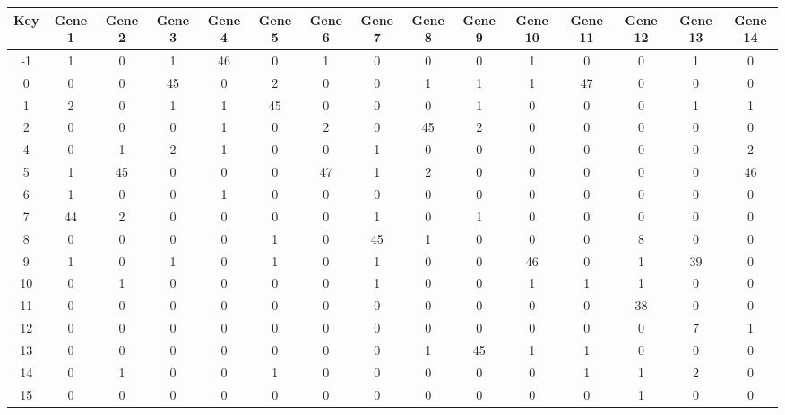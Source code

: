 \begin{tabular}{|c|c|c|c|c|c|c|c|c|c|c|c|c|c|c|}
\hline
Key & Gene 1 & Gene 2 & Gene 3 & Gene 4 & Gene 5 & Gene 6 & Gene 7 & Gene 8 & Gene 9 & Gene 10 & Gene 11 & Gene 12 & Gene 13 & Gene 14 \\
\hline
-1 & 1 & 0 & 1 & 46 & 0 & 1 & 0 & 0 & 0 & 1 & 0 & 0 & 1 & 0 \\
0 & 0 & 0 & 45 & 0 & 2 & 0 & 0 & 1 & 1 & 1 & 47 & 0 & 0 & 0 \\
1 & 2 & 0 & 1 & 1 & 45 & 0 & 0 & 0 & 1 & 0 & 0 & 0 & 1 & 1 \\
2 & 0 & 0 & 0 & 1 & 0 & 2 & 0 & 45 & 2 & 0 & 0 & 0 & 0 & 0 \\
4 & 0 & 1 & 2 & 1 & 0 & 0 & 1 & 0 & 0 & 0 & 0 & 0 & 0 & 2 \\
5 & 1 & 45 & 0 & 0 & 0 & 47 & 1 & 2 & 0 & 0 & 0 & 0 & 0 & 46 \\
6 & 1 & 0 & 0 & 1 & 0 & 0 & 0 & 0 & 0 & 0 & 0 & 0 & 0 & 0 \\
7 & 44 & 2 & 0 & 0 & 0 & 0 & 1 & 0 & 1 & 0 & 0 & 0 & 0 & 0 \\
8 & 0 & 0 & 0 & 0 & 1 & 0 & 45 & 1 & 0 & 0 & 0 & 8 & 0 & 0 \\
9 & 1 & 0 & 1 & 0 & 1 & 0 & 1 & 0 & 0 & 46 & 0 & 1 & 39 & 0 \\
10 & 0 & 1 & 0 & 0 & 0 & 0 & 1 & 0 & 0 & 1 & 1 & 1 & 0 & 0 \\
11 & 0 & 0 & 0 & 0 & 0 & 0 & 0 & 0 & 0 & 0 & 0 & 38 & 0 & 0 \\
12 & 0 & 0 & 0 & 0 & 0 & 0 & 0 & 0 & 0 & 0 & 0 & 0 & 7 & 1 \\
13 & 0 & 0 & 0 & 0 & 0 & 0 & 0 & 1 & 45 & 1 & 1 & 0 & 0 & 0 \\
14 & 0 & 1 & 0 & 0 & 1 & 0 & 0 & 0 & 0 & 0 & 1 & 1 & 2 & 0 \\
15 & 0 & 0 & 0 & 0 & 0 & 0 & 0 & 0 & 0 & 0 & 0 & 1 & 0 & 0 \\
\hline
\end{tabular}